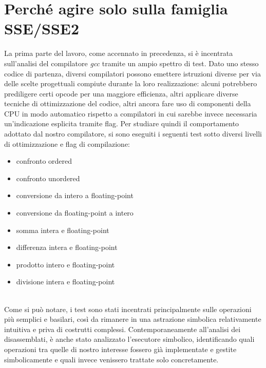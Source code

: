 \documentclass[Lau, oneside]{sapthesis}%
\begin{document}
\newpage
\section{Perché agire solo sulla famiglia SSE/SSE2}
La prima parte del lavoro, come accennato in precedenza, si è incentrata sull'analisi del compilatore \textit{gcc} tramite un ampio spettro di test.
\newline \newline
Dato uno stesso codice di partenza, diversi compilatori possono emettere istruzioni diverse per via delle scelte progettuali compiute durante la loro realizzazione: alcuni potrebbero prediligere certi opcode per una maggiore efficienza, altri applicare diverse tecniche di ottimizzazione del codice, altri ancora fare uso di componenti della CPU in modo automatico rispetto a compilatori in cui sarebbe invece necessaria un'indicazione esplicita tramite flag.
\newline \newline
Per studiare quindi il comportamento adottato dal nostro compilatore, si sono eseguiti i seguenti test sotto diversi livelli di ottimizzazione e flag di compilazione:
\begin{itemize}
    \item confronto ordered
    \item confronto unordered
    \item conversione da intero a floating-point
    \item conversione da floating-point a intero
    \item somma intera e floating-point
    \item differenza intera e floating-point
    \item prodotto intero e floating-point
    \item divisione intera e floating-point
\end{itemize}
\ \\
Come si può notare, i test sono stati incentrati principalmente sulle operazioni più semplici e basilari, così da rimanere in una astrazione simbolica relativamente intuitiva e priva di costrutti complessi.
\newline
Contemporaneamente all'analisi dei disassemblati, è anche stato analizzato l'esecutore simbolico, identificando quali operazioni tra quelle di nostro interesse fossero già implementate e gestite simbolicamente e quali invece venissero trattate solo concretamente. 
\newline \newline
\end{document}
